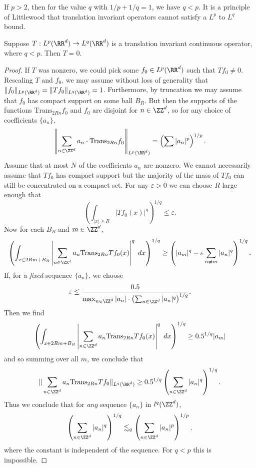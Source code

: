 If $p > 2$, then for the value $q$ with $1/p + 1/q = 1$, we have $q < p$. It is a principle of Littlewood that translation invariant operators cannot satisfy a $L^p$ to $L^q$ bound.

\begin{theorem}
    Suppose $T: L^p(\RR^d) \to L^q(\RR^d)$ is a translation invariant continuous operator, where $q < p$. Then $T = 0$.
\end{theorem}
\begin{proof}
    If $T$ was nonzero, we could pick some $f_0 \in L^p(\RR^d)$ such that $Tf_0 \neq 0$. Rescaling $T$ and $f_0$, we may assume without loss of generality that $\| f_0 \|_{L^p(\RR^d)} = \| Tf_0 \|_{L^q(\RR^d)} = 1$. Furthermore, by truncation we may assume that $f_0$ has compact support on some ball $B_R$. But then the supports of the functions $\text{Trans}_{2Rn} f_0$ and $f_0$ are disjoint for $n \in \ZZ^d$, so for any choice of coefficients $\{ a_n \}$,
    \[ \left\| \sum_{n \in \ZZ^d} a_n \cdot \text{Trans}_{2R n} f_0 \right\|_{L^p(\RR^d)} = \left( \sum |a_n|^p \right)^{1/p}. \]
    Assume that at most $N$ of the coefficients $a_n$ are nonzero. We cannot necessarily assume that $Tf_0$ has compact support but the majority of the mass of $Tf_0$ can still be concentrated on a compact set. For any $\varepsilon > 0$ we can choose $R$ large enough that
    \[ \left( \int_{|x| \geq R} |Tf_0(x)|^q \right)^{1/q} \leq \varepsilon. \]
    Now for each $B_R$ and $m \in \ZZ^d$,
    \[ \left( \int_{x \in 2Rm + B_R} \left| \sum_{n \in \ZZ^d} a_n \text{Trans}_{2Rn} Tf_0(x) \right|^q\; dx \right)^{1/q} \geq \left( |a_m|^q - \varepsilon \sum_{n \neq m} |a_n|^q \right)^{1/q}. \]
    If, for a \emph{fixed} sequence $\{ a_n \}$, we choose
    \[ \varepsilon \leq \frac{0.5}{\max_{n \in \ZZ^d}|a_n| \cdot \left( \sum_{n \in \ZZ^d} |a_n|^q \right)^{1/q}}. \]
    Then we find
    \[ \left( \int_{x \in 2Rm + B_R} \left| \sum_{n \in \ZZ^d} a_n \text{Trans}_{2Rn} Tf_0(x) \right|^q\; dx \right)^{1/q} \geq 0.5^{1/q} |a_m| \]
    and so summing over all $m$, we conclude that
    \[ \| \sum_{n \in \ZZ^d} a_n \text{Trans}_{2Rn} Tf_0 \|_{L^q(\RR^d)} \geq 0.5^{1/q} \left( \sum_{n \in \ZZ^d} |a_n|^q \right)^{1/q}. \]
    Thus we conclude that for \emph{any} sequence $\{ a_n \}$ in $l^q(\ZZ^d)$,
    \[ \left( \sum_{n \in \ZZ^d} |a_n|^q \right)^{1/q} \lesssim_q \left( \sum_{n \in \ZZ^d} |a_n|^p \right)^{1/p}. \]
    where the constant is independent of the sequence. For $q < p$ this is impossible.
\end{proof}

